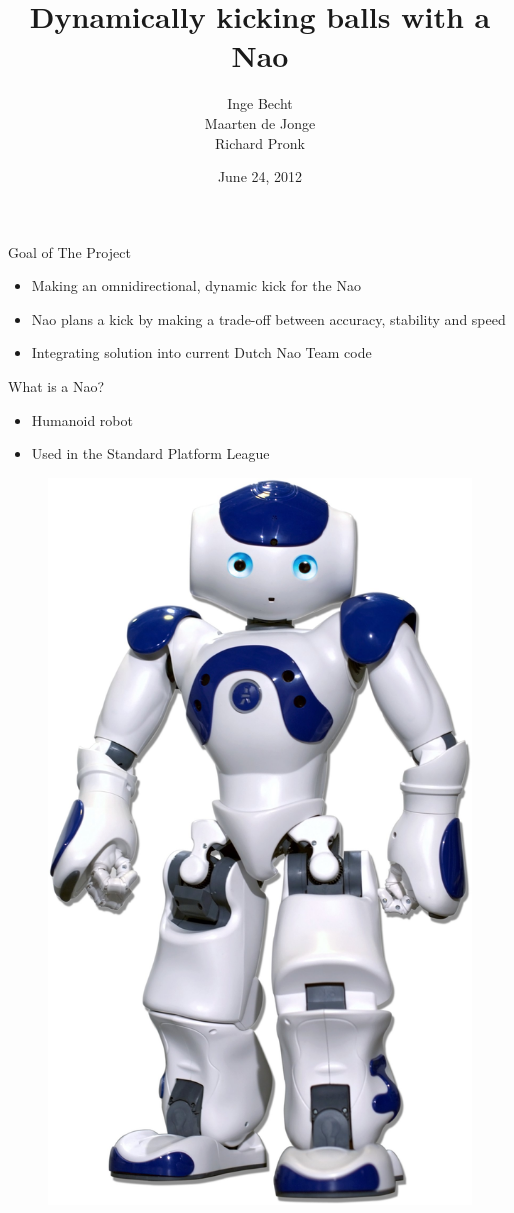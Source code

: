 \documentclass{beamer}
\title[Dynamically kicking balls]{Dynamically kicking balls with a
Nao}
\author{Inge Becht\\ Maarten de Jonge\\ Richard Pronk}
\institute{University of Amsterdam}
\date{June 24, 2012}
\begin{document}
\begin{frame}
\titlepage
\end{frame}

\begin{frame}{Goal of The Project}
    \begin{itemize}
        \item{Making an omnidirectional, dynamic kick for the Nao}
        \item{Nao plans a kick by making a trade-off between
             accuracy, stability and speed}
        \item{Integrating solution into current Dutch Nao Team code}
    \end{itemize}
\end{frame}

\begin{frame}{What is a Nao?}
    \begin{itemize}
        \item{Humanoid robot}
        \item{Used in the Standard Platform League}
    \end{itemize}
     \begin{figure}[H] 
        \begin{center}
            \includegraphics[scale=0.2]{nao.jpg}

\end{center}
\end{figure}
\end{frame}
\end{document}
